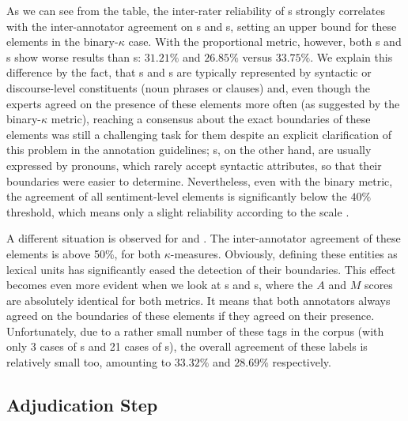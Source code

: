 As we can see from the table, the inter-rater reliability of
s strongly correlates with the inter-annotator
agreement on s and s, setting an
upper bound for these elements in the binary-$\kappa$ case.  With the
proportional metric, however, both s and
s show worse results than s:
$31.21\%$ and $26.85\%$ versus $33.75\%$.  We explain this difference
by the fact, that s and s are
typically represented by syntactic or discourse-level constituents
(noun phrases or clauses) and, even though the experts agreed on the
presence of these elements more often (as suggested by the
binary-$\kappa$ metric), reaching a consensus about the exact
boundaries of these elements was still a challenging task for them
despite an explicit clarification of this problem in the annotation
guidelines; s, on the other hand, are usually
expressed by pronouns, which rarely accept syntactic attributes, so
that their boundaries were easier to determine.  Nevertheless, even
with the binary metric, the agreement of all sentiment-level elements
is significantly below the $40\%$ threshold, which means only a slight
reliability according to the \citeauthor{Landis:77} scale
\cite{Landis:77}.

A different situation is observed for  and
.  The inter-annotator agreement of these
elements is above 50\%, for both $\kappa$-measures.  Obviously,
defining these entities as lexical units has significantly eased the
detection of their boundaries.  This effect becomes even more evident
when we look at s and s, where
the $A$ and $M$ scores are absolutely identical for both metrics.  It
means that both annotators always agreed on the boundaries of these
elements if they agreed on their presence.  Unfortunately, due to a
rather small number of these tags in the corpus (with only 3 cases of
s and 21 cases of s), the
overall agreement of these labels is relatively small too, amounting
to $33.32\%$ and $28.69\%$ respectively.

\subsection{Adjudication Step}\label{subsec:eval-adjudication-step}

